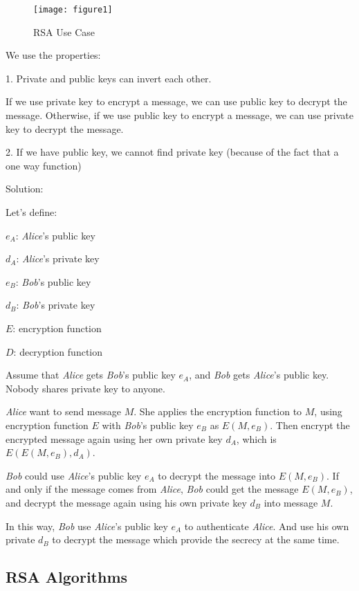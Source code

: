 \documentclass[twoside]{article}
\begin{document}
\begin{figure}[ht!]
\centering
    \texttt{[image: figure1]}
\caption{RSA Use Case\label{p1}}
\end{figure}

We use the properties:

1. Private and public keys can invert each other.

If we use private key to encrypt a message, we can use public key to decrypt the message.
Otherwise, if we use public key to encrypt a message, we can use private key to decrypt the message.

2. If we have public key, we cannot find private key (because of the fact that a one way function)

Solution:

Let's define:

$e_A$: \textit{Alice}'s public key

$d_A$: \textit{Alice}'s private key

$e_B$: \textit{Bob}'s public key

$d_B$: \textit{Bob}'s private key

$E$: encryption function

$D$: decryption function


Assume that \textit{Alice} gets \textit{Bob}'s public key $e_A$,
and \textit{Bob} gets \textit{Alice}'s public key. Nobody shares private key to anyone.

\textit{Alice} want to send message $M$. She applies the encryption function to $M$,
using encryption function $E$ with \textit{Bob}'s public key $e_B$
as $E(M, e_B)$. Then encrypt the encrypted message again using her own private key
$d_A$, which is $E(E(M, e_B), d_A)$.

\textit{Bob} could use \textit{Alice}'s public key $e_A$ to decrypt the message into
$E(M, e_B)$. If and only if the message comes from \textit{Alice}, \textit{Bob} could
get the message $E(M, e_B)$, and decrypt the message again using his own private key
$d_B$ into message $M$.

In this way, \textit{Bob} use \textit{Alice}'s public key $e_A$ to authenticate 
\textit{Alice}. And use his own private $d_B$ to decrypt the message which 
provide the secrecy at the same time.

\subsection{RSA Algorithms}
\end{document}
